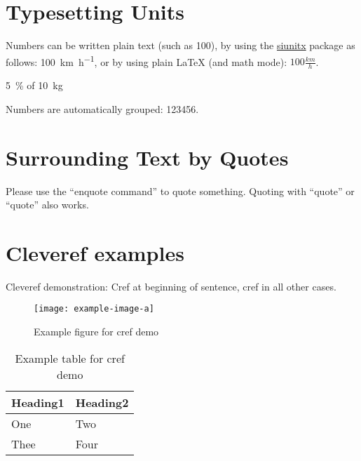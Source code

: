 \documentclass[
  numbers=autoendperiod,
  ngerman,  %
  a4paper,  %
  twoside,  %
  bibliography=totoc,
  headsepline,
  cleardoublepage=empty,
  parskip=half,
  draft=false
]{scrbook}
\theoremstyle{break}
\begin{document}
\section{Typesetting Units}

\begin{ltgexample}
Numbers can be written plain text (such as 100), by using the \href{https://ctan.org/pkg/siunitx}{siunitx} package as follows:
\SI{100}{\km\per\hour},
or by using plain \LaTeX{} (and math mode):
$100 \frac{\mathit{km}}{h}$.
\end{ltgexample}

\begin{ltgexample}
\SI{5}{\percent} of \SI{10}{kg}
\end{ltgexample}

\begin{ltgexample}
Numbers are automatically grouped: \num{123456}.
\end{ltgexample}

\section{Surrounding Text by Quotes}

\begin{ltgexample}
Please use the \enquote{enquote command} to quote something.
Quoting with "`quote"' or ``quote'' also works.

\end{ltgexample}

\section{Cleveref examples}
\label{sec:ex:cref}

Cleveref demonstration: Cref at beginning of sentence, cref in all other cases.

\begin{figure}
  \centering
  \texttt{[image: example-image-a]}
  \caption{Example figure for cref demo}
  \label{fig:ex:cref}
\end{figure}

\begin{table}
  \centering
  \begin{tabular}{ll}
    \toprule
    Heading1 & Heading2 \\
    \midrule
    One      & Two      \\
    Thee     & Four     \\
    \bottomrule
  \end{tabular}
  \caption{Example table for cref demo}
  \label{tab:ex:cref}
\end{table}
\end{document}
